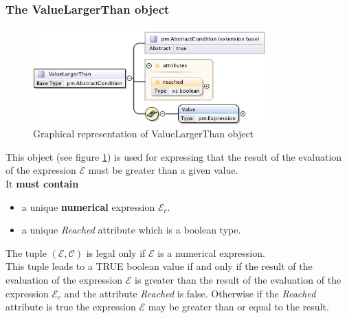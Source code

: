 \documentclass[a4paper,11pt] {ivoa}
\begin{document}
\subsubsection{The ValueLargerThan object}
\begin{figure}[htbp]
\begin{center}
\includegraphics[width=0.8\textwidth]{pictures/ValueLargerThan.jpg} 
\caption{Graphical representation of ValueLargerThan object}
\label{Pic-ValueLargerThan}
\end{center}
\end{figure}
This object (see figure \ref{Pic-ValueLargerThan}) is used for expressing that the result of the
evaluation of the expression $\mathcal E$ must be greater than a given value.\\
It {\bf must contain}
\begin{itemize}
\item a unique {\bf numerical} expression $\mathcal E_c$. 
\item a unique {\it Reached} attribute which is a boolean type.
\end{itemize}
The tuple $(\mathcal E, \mathcal C)$ is legal only if $\mathcal E$ is a numerical expression.\\
This tuple leads to a TRUE boolean value if and only if the result of the evaluation of the
expression $\mathcal E$ is greater than the result of the evaluation
of the expression $\mathcal E_c$ and the attribute {\it Reached} is false. Otherwise if the {\it
Reached} attribute is true the expression $\mathcal E$ may be greater than or equal to the result.
\end{document}
